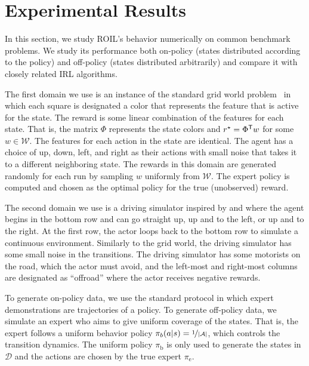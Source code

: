
\section{Experimental Results}
\label{sec:experimental-results}


In this section, we study ROIL's behavior numerically on common benchmark problems. We study its performance both on-policy (states distributed according to the  policy) and off-policy (states distributed arbitrarily) and compare it with closely related IRL algorithms.

The first domain we use is an instance of the standard grid world problem~\cite{abbeel2004} in which each square is designated a color that represents the feature that is active for the state. The reward is some linear combination of the features for each state. That is, the matrix $\Phi$ represents the state colors and  $r^{\star}  = \Phi^{\mathsf{T}} w$ for some $w \in \mathcal{W}$. The features for each action in the state are identical. The agent has a choice of up, down, left, and right as their actions with small noise that takes it to a different neighboring state. The rewards in this domain are generated randomly for each run by sampling $w$ uniformly from $\mathcal{W}$. The expert policy is computed and chosen as the optimal policy for the true (unobserved) reward.

The second domain we use is a driving simulator inspired by \citet{abbeel2004} and \citet{Syed2008} where the agent begins in the bottom row and can go straight up, up and to the left, or up and to the right. At the first row, the actor loops back to the bottom row to simulate a continuous environment. Similarly to the grid world, the driving simulator has some small noise in the transitions. The driving simulator has some motorists on the road, which the actor must avoid, and the left-most and right-most columns are designated as ``offroad'' where the actor receives negative rewards.

To generate on-policy data, we use the standard protocol in which expert demonstrations are trajectories of a policy. To generate off-policy data, we simulate an expert who aims to give uniform coverage of the states. That is, the expert follows a uniform behavior policy  $\pi_b(a|s) = \nicefrac{1}{\lvert \mathcal{A} \rvert}$, which controls the transition dynamics. The uniform policy $\pi_{\mathrm{b}}$ is only used to generate the states in $\mathcal{D}$ and the actions are chosen by the true expert $\pi_{\mathrm{e}}$.

